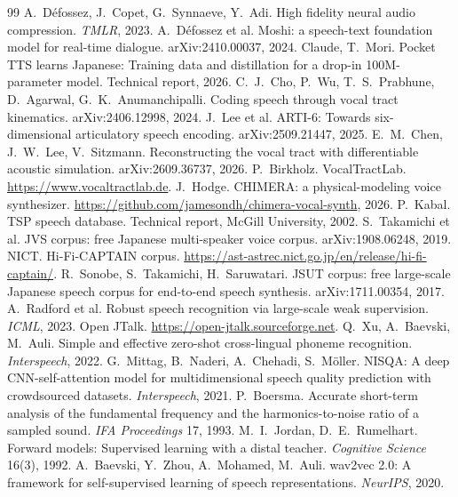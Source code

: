 \documentclass[10pt,a4paper,twocolumn]{article}
\begin{document}
\begin{thebibliography}{99}\footnotesize
\setlength{\itemsep}{0pt}\setlength{\parskip}{1.5pt plus 1pt}
 A.~Défossez, J.~Copet, G.~Synnaeve, Y.~Adi. High fidelity neural audio
compression. \emph{TMLR}, 2023.
 A.~Défossez et al. Moshi: a speech-text foundation model for real-time dialogue.
arXiv:2410.00037, 2024.
 Claude, T.~Mori. Pocket TTS learns Japanese: Training data and distillation for
a drop-in 100M-parameter model. Technical report, 2026.
 C.~J.~Cho, P.~Wu, T.~S.~Prabhune, D.~Agarwal, G.~K.~Anumanchipalli. Coding speech
through vocal tract kinematics. arXiv:2406.12998, 2024.
 J.~Lee et al. ARTI-6: Towards six-dimensional articulatory speech encoding.
arXiv:2509.21447, 2025.
 E.~M.~Chen, J.~W.~Lee, V.~Sitzmann. Reconstructing the vocal tract with
differentiable acoustic simulation. arXiv:2609.36737, 2026.
 P.~Birkholz. VocalTractLab. \url{https://www.vocaltractlab.de}.
 J.~Hodge. CHIMERA: a physical-modeling voice synthesizer.
\url{https://github.com/jamesondh/chimera-vocal-synth}, 2026.
 P.~Kabal. TSP speech database. Technical report, McGill University, 2002.
 S.~Takamichi et al. JVS corpus: free Japanese multi-speaker voice corpus.
arXiv:1908.06248, 2019.
 NICT. Hi-Fi-CAPTAIN corpus.
\url{https://ast-astrec.nict.go.jp/en/release/hi-fi-captain/}.
 R.~Sonobe, S.~Takamichi, H.~Saruwatari. JSUT corpus: free large-scale Japanese
speech corpus for end-to-end speech synthesis. arXiv:1711.00354, 2017.
 A.~Radford et al. Robust speech recognition via large-scale weak supervision.
\emph{ICML}, 2023.
 Open JTalk. \url{https://open-jtalk.sourceforge.net}.
 Q.~Xu, A.~Baevski, M.~Auli. Simple and effective zero-shot cross-lingual
phoneme recognition. \emph{Interspeech}, 2022.
 G.~Mittag, B.~Naderi, A.~Chehadi, S.~Möller. NISQA: A deep CNN-self-attention
model for multidimensional speech quality prediction with crowdsourced datasets.
\emph{Interspeech}, 2021.
 P.~Boersma. Accurate short-term analysis of the fundamental frequency and the
harmonics-to-noise ratio of a sampled sound. \emph{IFA Proceedings} 17, 1993.
 M.~I.~Jordan, D.~E.~Rumelhart. Forward models: Supervised learning with a distal
teacher. \emph{Cognitive Science} 16(3), 1992.
 A.~Baevski, Y.~Zhou, A.~Mohamed, M.~Auli. wav2vec 2.0: A framework for
self-supervised learning of speech representations. \emph{NeurIPS}, 2020.

\end{thebibliography}
\end{document}
